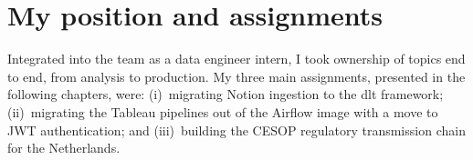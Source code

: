 \section{My position and assignments}

Integrated into the team as a data engineer intern, I took ownership of topics end to end, from analysis to production. My three main assignments, presented in the following chapters, were: (i)~migrating Notion ingestion to the dlt framework; (ii)~migrating the Tableau pipelines out of the Airflow image with a move to JWT authentication; and (iii)~building the CESOP regulatory transmission chain for the Netherlands.